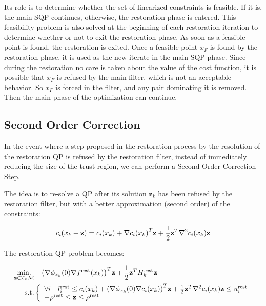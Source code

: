 Its role is to determine whether the set of linearized constraints is feasible.
If it is, the main SQP continues, otherwise, the restoration phase is entered.
This feasibility problem is also solved at the beginning of each restoration iteration to determine whether or not to exit the restoration phase.
As soon as a feasible point is found, the restoration is exited.
Once a feasible point $x_F$ is found by the restoration phase, it is used as the new iterate in the main SQP phase.
Since during the restoration no care is taken about the value of the cost function, it is possible that $x_F$ is refused by the main filter, which is not an acceptable behavior.
So $x_F$ is forced in the filter, and any pair dominating it is removed.
Then the main phase of the optimization can continue.

\subsection{Second Order Correction}
\label{sub:second_order_correction}

In the event where a step proposed in the restoration process by the resolution of the restoration QP is refused by the restoration filter, instead of immediately reducing the size of the trust region, we can perform a Second Order Correction Step.

The idea is to re-solve a QP after its solution $\mathbf{z}_k$ has been refused by the restoration filter, but with a better approximation (second order) of the constraints:

\begin{equation}
  c_i(x_k+{\bf z}) = c_i(x_k) + {\nabla c_i(x_k)}^T {\bf z} + \frac{1}{2}{\bf z}^T{\nabla}^2c_i(x_k){\bf z}
\end{equation}

The restoration QP problem becomes:

\begin{align}
  \label{eq:QP_soc_dirty}
  \begin{split}
  \operatorname*{min.}_{\mathbf{z} \in T_x\mathcal{M} } & \quad {\left(\nabla\phi_{x_k}(0) \nabla f^\text{rest} (x_k)\right)}^T\mathbf{z} + \frac{1}{2} {\bf z }^T H^\text{rest}_k{\bf z }\\
  \text{s.t.}&\left\{
  \begin{array}{lr}
    \forall i \quad l^\text{rest}_i \leq c_i(x_k) + {\left(\nabla\phi_{x_k}(0) \nabla c_i (x_k)\right)}^T\mathbf{z} + \frac{1}{2}{\bf z}^T{\nabla}^2c_i(x_k){\bf z}
 \leq u^\text{rest}_i \\
    -\rho^\text{rest} \leq \mathbf{z} \leq \rho^\text{rest} \\
  \end{array}\right.
  \end{split}
\end{align}

